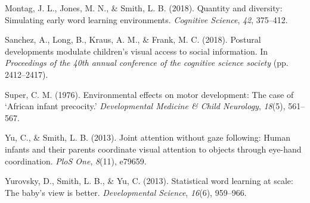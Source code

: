 \documentclass[10pt, letterpaper]{article}
\newenvironment{CSLReferences}%
  {}%
  {\par}
\begin{document}
\begin{CSLReferences}{1}{0}
\leavevmode\hypertarget{ref-montag2018quantity}{}%
Montag, J. L., Jones, M. N., \& Smith, L. B. (2018). Quantity and
diversity: Simulating early word learning environments. \emph{Cognitive
Science}, \emph{42}, 375--412.

\leavevmode\hypertarget{ref-sanchez2018detecting}{}%
Sanchez, A., Long, B., Kraus, A. M., \& Frank, M. C. (2018). Postural
developments modulate children's visual access to social information. In
\emph{Proceedings of the 40th annual conference of the cognitive science
society} (pp. 2412--2417).

\leavevmode\hypertarget{ref-super1976environmental}{}%
Super, C. M. (1976). Environmental effects on motor development: The
case of {`{A}frican infant precocity.'} \emph{Developmental Medicine \&
Child Neurology}, \emph{18}(5), 561--567.

\leavevmode\hypertarget{ref-yu2013joint}{}%
Yu, C., \& Smith, L. B. (2013). Joint attention without gaze following:
Human infants and their parents coordinate visual attention to objects
through eye-hand coordination. \emph{PloS One}, \emph{8}(11), e79659.

\leavevmode\hypertarget{ref-yurovsky2013statistical}{}%
Yurovsky, D., Smith, L. B., \& Yu, C. (2013). Statistical word learning
at scale: The baby's view is better. \emph{Developmental Science},
\emph{16}(6), 959--966.

\end{CSLReferences}


\end{document}
